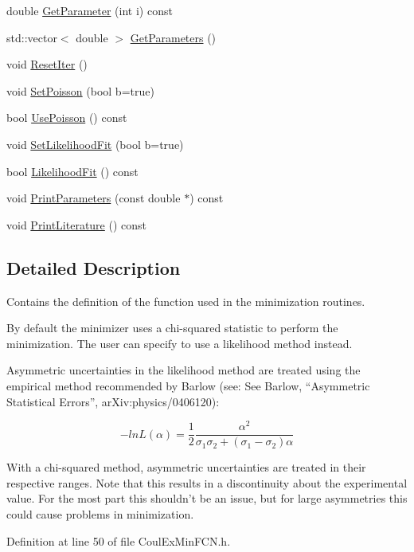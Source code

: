 \begin{DoxyCompactItemize}
double \hyperlink{classCoulExMinFCN_aa588591bbc923ab42070b42b74c1dfc8}{Get\-Parameter} (int i) const 
\item 
std\-::vector$<$ double $>$ \hyperlink{classCoulExMinFCN_ac49f8e36a62aac46b1300eca173f486f}{Get\-Parameters} ()
\item 
void \hyperlink{classCoulExMinFCN_ad15983e7cecf6fb939c55d47b2a9e700}{Reset\-Iter} ()
\item 
void \hyperlink{classCoulExMinFCN_a96c96926312d6e52c797274035410894}{Set\-Poisson} (bool b=true)
\item 
bool \hyperlink{classCoulExMinFCN_a076212903b18324a472ef11310bf8fc3}{Use\-Poisson} () const 
\item 
void \hyperlink{classCoulExMinFCN_a17f18c83c3a60c89e038f91b946c495d}{Set\-Likelihood\-Fit} (bool b=true)
\item 
bool \hyperlink{classCoulExMinFCN_a126ede898be9dd935ea7f65b7120f223}{Likelihood\-Fit} () const 
\item 
void \hyperlink{classCoulExMinFCN_ac04ed9f88568217d29cc3d120dc3313d}{Print\-Parameters} (const double $\ast$) const 
\item 
void \hyperlink{classCoulExMinFCN_a10083549e7bd702a8ecce0d937e66a8f}{Print\-Literature} () const 
\end{DoxyCompactItemize}


\subsection{Detailed Description}
Contains the definition of the function used in the minimization routines. 

By default the minimizer uses a chi-\/squared statistic to perform the minimization. The user can specify to use a likelihood method instead.

Asymmetric uncertainties in the likelihood method are treated using the empirical method recommended by Barlow (see\-: See Barlow, “\-Asymmetric Statistical Errors”, ar\-Xiv\-:physics/0406120)\-:

\[ -lnL(\alpha) = \frac{1}{2} \frac{\alpha^2}{\sigma_1\sigma_2 + (\sigma_1 - \sigma_2)\alpha} \]

With a chi-\/squared method, asymmetric uncertainties are treated in their respective ranges. Note that this results in a discontinuity about the experimental value. For the most part this shouldn't be an issue, but for large asymmetries this could cause problems in minimization. 

Definition at line 50 of file Coul\-Ex\-Min\-F\-C\-N.\-h.



